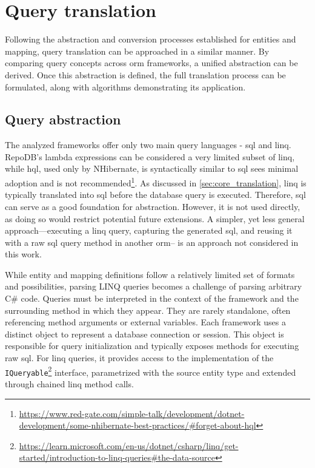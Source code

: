 \chapter{Query translation}
Following the abstraction and conversion processes established for entities and mapping, query translation can be approached in a similar manner. By comparing query concepts across \acrshort{orm} frameworks, a unified abstraction can be derived. Once this abstraction is defined, the full translation process can be formulated, along with algorithms demonstrating its application. 


\section{Query abstraction}
The analyzed frameworks offer only two main query languages - \acrshort{sql} and \acrshort{linq}. RepoDB's lambda expressions can be considered a very limited subset of \acrshort{linq}, while \acrshort{hql}, used only by NHibernate, is syntactically similar to \acrshort{sql} sees minimal adoption and is not recommended\footnote{\url{https://www.red-gate.com/simple-talk/development/dotnet-development/some-nhibernate-best-practices/\#forget-about-hql}}. As discussed in \autoref{sec:core_translation}, \acrshort{linq} is typically translated into \acrshort{sql} before the database query is executed. Therefore, \acrshort{sql} can serve as a good foundation for abstraction. However, it is not used directly, as doing so would restrict potential future extensions. A simpler, yet less general approach---executing a \acrshort{linq} query, capturing the generated \acrshort{sql}, and reusing it with a raw \acrshort{sql} query method in another \acrshort{orm}-- is an approach not considered in this work.

While entity and mapping definitions follow a relatively limited set of formats and possibilities, parsing LINQ queries becomes a challenge of parsing arbitrary C\# code. Queries must be interpreted in the context of the framework and the surrounding method in which they appear. They are rarely standalone, often referencing method arguments or external variables. Each framework uses a distinct object to represent a database connection or session. This object is responsible for query initialization and typically exposes methods for executing raw \acrshort{sql}. For \acrshort{linq} queries, it provides access to the implementation of the \texttt{IQueryable}\footnote{\url{https://learn.microsoft.com/en-us/dotnet/csharp/linq/get-started/introduction-to-linq-queries\#the-data-source}} interface, parametrized with the source entity type and extended through chained \acrshort{linq} method calls.

